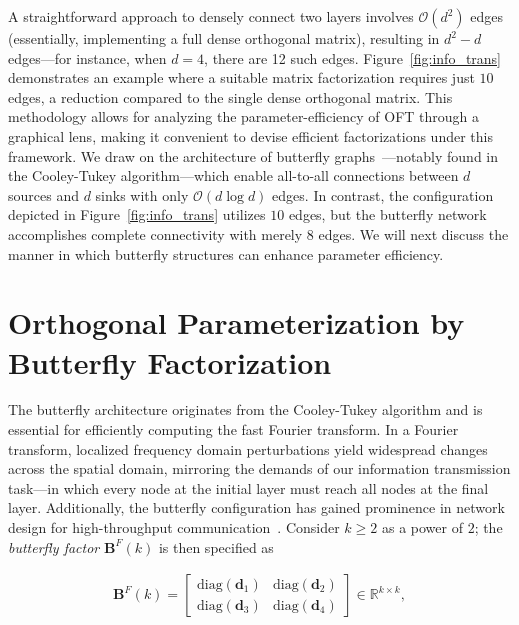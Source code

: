A straightforward approach to densely connect two layers involves $\mathcal{O}(d^2)$ edges (essentially, implementing a full dense orthogonal matrix), resulting in $d^2-d$ edges—for instance, when $d=4$, there are 12 such edges. Figure~\ref{fig:info_trans} demonstrates an example where a suitable matrix factorization requires just $10$ edges, a reduction compared to the single dense orthogonal matrix. This methodology allows for analyzing the parameter-efficiency of OFT through a graphical lens, making it convenient to devise efficient factorizations under this framework. We draw on the architecture of butterfly graphs~\cite{cooley1965algorithm}—notably found in the Cooley-Tukey algorithm—which enable all-to-all connections between $d$ sources and $d$ sinks with only $\mathcal{O}(d\log d)$ edges. In contrast, the configuration depicted in Figure~\ref{fig:info_trans} utilizes $10$ edges, but the butterfly network accomplishes complete connectivity with merely $8$ edges. We will next discuss the manner in which butterfly structures can enhance parameter efficiency.

\section{Orthogonal Parameterization by Butterfly Factorization}

The butterfly architecture originates from the Cooley-Tukey algorithm and is essential for efficiently computing the fast Fourier transform. In a Fourier transform, localized frequency domain perturbations yield widespread changes across the spatial domain, mirroring the demands of our information transmission task—in which every node at the initial layer must reach all nodes at the final layer. Additionally, the butterfly configuration has gained prominence in network design for high-throughput communication~\cite{solihin2015fundamentals,li2011linear}. Consider $k\geq 2$ as a power of $2$; the \emph{butterfly factor} $\bm{B}^F(k)$ is then specified as

\begin{equation}\label{eq:but_factor}
\begin{aligned}
    \bm{B}^F(k)=\begin{bmatrix}
    \text{diag}(\bm{d}_1) & \text{diag}(\bm{d}_2) \\
    \text{diag}(\bm{d}_3) & \text{diag}(\bm{d}_4)
    \end{bmatrix}\in\mathbb{R}^{k\times k},
\end{aligned}
\end{equation}

